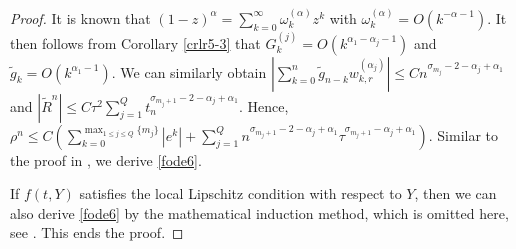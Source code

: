 \documentclass[10pt]{siamltex}
\begin{document}
\begin{proof}
It is known that $(1-z)^{\alpha}=\sum_{k=0}^{\infty}\omega_k^{(\alpha)}z^k$ with $\omega_k^{(\alpha)}=O(k^{-\alpha-1})$.
It then follows from  Corollary \ref{crlr5-3} that $G^{(j)}_{k}=O(k^{\alpha_1-\alpha_j-1})$ and $\tilde{g}_{k}=O(k^{\alpha_1-1})$.
We can similarly obtain
$|\sum_{k=0}^n\tilde{g}_{n-k}w^{(\alpha_j)}_{k,r}|\leq Cn^{\sigma_{m_j}-2-\alpha_j+\alpha_1}$
and
$|\tilde{R}^n|\leq C \tau^2\sum_{j=1}^{Q}t_n^{\sigma_{m_j+1}-2-\alpha_j+\alpha_1}$.
Hence,
$\rho^n\leq  C\left(\sum_{k=0}^{\max_{1\leq j\leq Q}\{m_j\}}|e^k|
+\sum_{j=1}^{Q}n^{\sigma_{m_j+1}-2-\alpha_j+\alpha_1}\tau^{\sigma_{m_j+1}-\alpha_j+\alpha_1}\right)$.
Similar to the proof in   \cite[Lemma 3.4]{LiZeng13},  we derive \eqref{fode6}.

If $f(t,Y)$ satisfies the local Lipschitz condition with respect to $Y$, then we can
also derive \eqref{fode6} by the mathematical induction method, which is omitted here,
see \cite{LiZeng13}. This ends the proof.
\end{proof}
\end{document}
